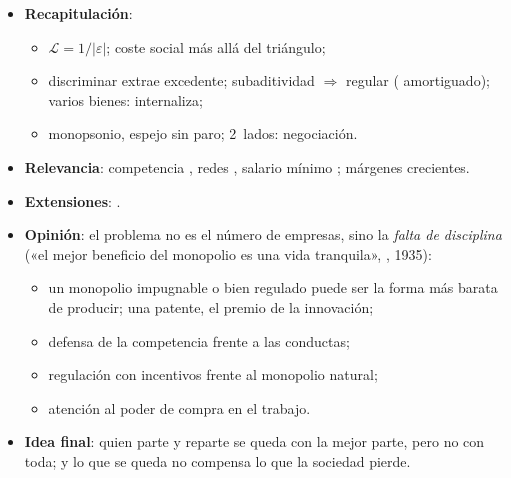 \documentclass{article}
\begin{document}
\begin{columnas}
\begin{itemize}
\item \textbf{Recapitulación}:
  \begin{itemize}
  \item $\mathcal{L}=1/|\varepsilon|$; coste social más allá del triángulo;
  \item discriminar extrae excedente; subaditividad $\Rightarrow$ regular ( amortiguado); varios bienes: internaliza;
  \item monopsonio, espejo sin paro; 2~lados: negociación.
  \end{itemize}
\item \textbf{Relevancia}: competencia , redes , salario mínimo ; márgenes crecientes.
\item \textbf{Extensiones}:      .
\item \textbf{Opinión}: el problema no es el número de empresas, sino la \emph{falta de disciplina} («el mejor beneficio del monopolio es una vida tranquila», , 1935):
  \begin{itemize}
  \item un monopolio impugnable o bien regulado puede ser la forma más barata de producir; una patente, el premio de la innovación;
  \item defensa de la competencia frente a las conductas;
  \item regulación con incentivos frente al monopolio natural;
  \item atención al poder de compra en el trabajo.
  \end{itemize}
\item \textbf{Idea final}: quien parte y reparte se queda con la mejor parte, pero no con toda; y lo que se queda no compensa lo que la sociedad pierde.
\end{itemize}


\end{columnas}
\end{document}
